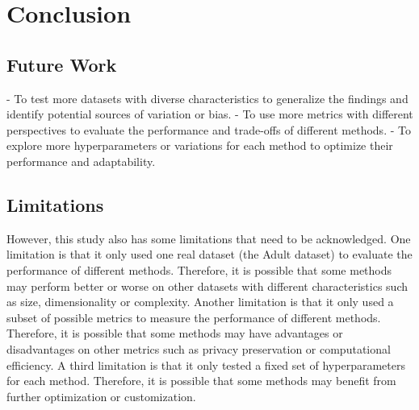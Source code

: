 \chapter{Conclusion}
\label{ch:conclusion}


\section{Future Work}
\label{ch:results-futureWork}

- To test more datasets with diverse characteristics to generalize the findings and identify potential sources of variation or bias.
- To use more metrics with different perspectives to evaluate the performance and trade-offs of different methods.
- To explore more hyperparameters or variations for each method to optimize their performance and adaptability.

\section{Limitations}
\label{ch:results-limitations}

However, this study also has some limitations that need to be acknowledged. One limitation is that it only used one real dataset (the Adult dataset) to evaluate the performance of different methods. 
Therefore, it is possible that some methods may perform better or worse on other datasets with different characteristics such as size, dimensionality or complexity. 
Another limitation is that it only used a subset of possible metrics to measure the performance of different methods. 
Therefore, it is possible that some methods may have advantages or disadvantages on other metrics such as privacy preservation or computational efficiency. 
A third limitation is that it only tested a fixed set of hyperparameters for each method. Therefore, it is possible that some methods may benefit from further optimization or customization.